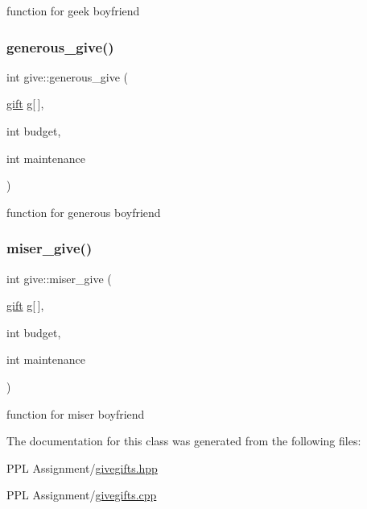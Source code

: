 function for geek boyfriend \mbox{\label{classgive_a1089b321ade4334159db94d7b91bb957}} 
\subsubsection{\texorpdfstring{generous\+\_\+give()}{generous\_give()}}
{\footnotesize\ttfamily int give\+::generous\+\_\+give (\begin{DoxyParamCaption}\item[{\hyperlink{classgift}{gift}}]{g\mbox{[}$\,$\mbox{]},  }\item[{int}]{budget,  }\item[{int}]{maintenance }\end{DoxyParamCaption})}

function for generous boyfriend \mbox{\label{classgive_a21ae8c333d4a779cf4ac2a36655b0461}} 
\subsubsection{\texorpdfstring{miser\+\_\+give()}{miser\_give()}}
{\footnotesize\ttfamily int give\+::miser\+\_\+give (\begin{DoxyParamCaption}\item[{\hyperlink{classgift}{gift}}]{g\mbox{[}$\,$\mbox{]},  }\item[{int}]{budget,  }\item[{int}]{maintenance }\end{DoxyParamCaption})}

function for miser boyfriend 

The documentation for this class was generated from the following files\+:\begin{DoxyCompactItemize}
\item 
P\+P\+L Assignment/\hyperlink{givegifts_8hpp}{givegifts.\+hpp}\item 
P\+P\+L Assignment/\hyperlink{givegifts_8cpp}{givegifts.\+cpp}\end{DoxyCompactItemize}
